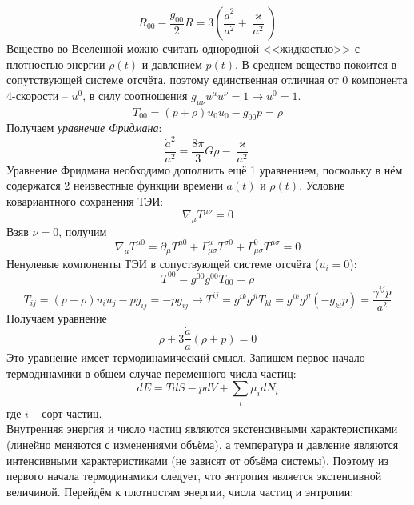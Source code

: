 \documentclass[12pt]{article}
\theoremstyle{definition}
\begin{document}
    \begin{equation}
        R_{00}-\frac{g_{00}}{2}R=3\left(\frac{\dot{a}^2}{a^2}+\frac{\varkappa}{a^2}\right)
    \end{equation}
    Вещество во Вселенной можно считать однородной <<жидкостью>> с плотностью энергии $\rho(t)$ и давлением $p(t)$. В среднем вещество покоится в сопутствующей системе отсчёта, поэтому единственная отличная от 0 компонента 4-скорости -- $u^0$, в силу соотношения $g_{\mu\nu}u^\mu u^\nu=1\rightarrow u^0=1$.
    \begin{equation}
        T_{00}=(p+\rho)u_0u_0-g_{00}p=\rho
    \end{equation}
    Получаем \textit{уравнение Фридмана}:
\begin{equation}\label{eq1}
    \boxed{\frac{\dot{a}^2}{a^2}=\frac{8\pi}{3}G\rho-\frac{\varkappa}{a^2}}
\end{equation}
Уравнение Фридмана необходимо дополнить ещё 1 уравнением, поскольку в нём содержатся 2 неизвестные функции времени $a(t)$ и $\rho(t)$. Условие ковариантного сохранения ТЭИ:
\begin{equation}
    \nabla_\mu T^{\mu\nu}=0
\end{equation}
Взяв $\nu=0$, получим
    \begin{equation}
        \nabla_\mu T^{\mu0}=\partial_\mu T^{\mu0}+\Gamma^\mu_{\mu\sigma}T^{\sigma0}+\Gamma^0_{\mu\sigma}T^{\mu\sigma}=0
    \end{equation}
    Ненулевые компоненты ТЭИ в сопуствующей системе отсчёта ($u_i=0$):
    \begin{equation}
        T^{00}=g^{00}g^{00}T_{00}=\rho
    \end{equation}
    \begin{equation}
        T_{ij}=(p+\rho)u_iu_j-pg_{ij}=-pg_{ij}\rightarrow T^{ij}=g^{ik}g^{jl}T_{kl}=g^{ik}g^{jl}(-g_{kl}p)=\frac{\gamma^{ij}p}{a^2}
    \end{equation}
Получаем уравнение
\begin{equation}\label{eq2}
    \boxed{\dot{\rho}+3\frac{\dot{a}}{a}(\rho+p)=0}
\end{equation}
Это уравнение имеет термодинамический смысл. Запишем первое начало термодинамики в общем случае переменного числа частиц:
\begin{equation}
    dE=TdS-pdV+\sum\limits_i\mu_idN_i
\end{equation}
где $i$ -- сорт частиц.\\
Внутренняя энергия и число частиц являются экстенсивными характеристиками (линейно меняются с изменениями объёма), а температура и давление являются интенсивными характеристиками (не зависят от объёма системы). Поэтому из первого начала термодинамики следует, что энтропия является экстенсивной величиной. Перейдём к плотностям энергии, числа частиц и энтропии:
\end{document}

